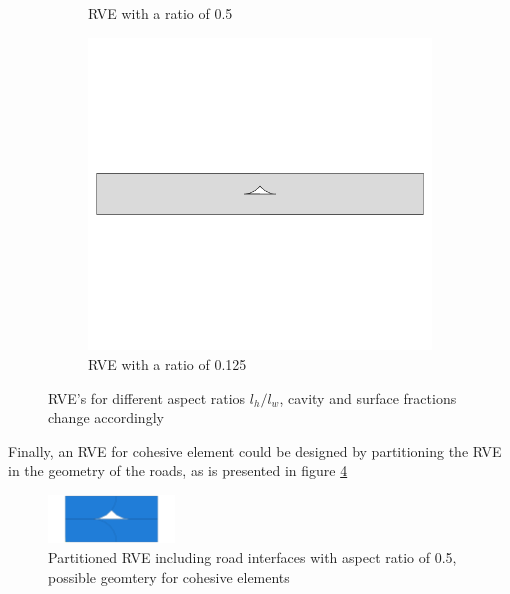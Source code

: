 \begin{figure}
\begin{subfigure}[b]{0.3\textwidth}
    \caption{RVE with a ratio of 0.5}
    \label{fig:RVE05}
\end{subfigure}
%
\begin{subfigure}[b]{0.3\textwidth}
    \includegraphics[width=\textwidth]{chapter_4_RVE_Definition/figures/0125clean.png}
    \caption{RVE with a ratio of 0.125}
    \label{fig:RVE0125}
\end{subfigure}
\caption{RVE's for different aspect ratios $l_h/l_w$, cavity and surface fractions change accordingly}
\end{figure}
Finally, an RVE for cohesive element could be designed by partitioning the RVE in the geometry of the roads, as is presented in figure \ref{fig:RVEcomplex}

\begin{figure}[H]
    \centering
    \includegraphics[width=0.3\textwidth]{chapter_4_RVE_Definition/figures/RVEcomplex.png}
    \caption{Partitioned RVE  including road interfaces with aspect ratio of 0.5, possible geomtery for cohesive elements}
    \label{fig:RVEcomplex}
\end{figure}




